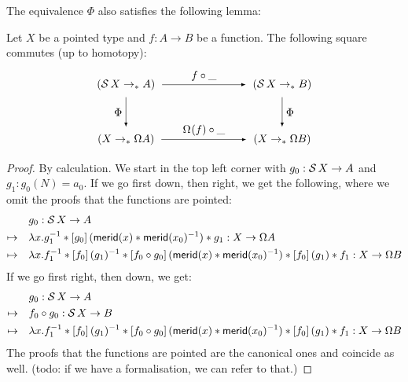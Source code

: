 \documentclass[english,a4]{article}
\renewcommand{\ap}[1]{\left[{#1}\right]}
\begin{document}
The equivalence $\Phi$ also satisfies the following lemma:

\begin{lemma} \label{lem:ap-Sigma}
    Let $X$ be a pointed type and $f : A \to B$ be a function.
    The following square commutes (up to homotopy):
    \begin{equation}
    \begin{tikzpicture}[x=5cm,y=-1.75cm,baseline=(current bounding box.center)]
    \tikzset{arrow/.style={shorten >=0.1cm,shorten <=.1cm,-latex}}
    \node (A) at (0,0) {$(\susp X \to_* A)$}; 
    \node (D) at (1,0) {$(\susp X \to_* B)$}; 
    \node (B) at (0,1) {$(X \to_* \Omega A)$}; 
    \node (C) at (1,1) {$(X \to_* \Omega B)$}; 
    
    \draw[arrow] (A) to node [above] {$f \circ \_$} (D);
    \draw[arrow] (A) to node [left] {$\Phi$} (B);
    \draw[arrow] (B) to node [above] {$\loopspace\null (f) \circ \_$} (C);
    \draw[arrow] (D) to node [right] {$\Phi$} (C);
    \end{tikzpicture}
    \end{equation}
\end{lemma}
\begin{proof}
    By calculation.
    We start in the top left corner with $g_0 : \operatorname{\mathcal S} X \to A$ and $g_1 : g_0(N) = a_0$. If we go first down, then right, we get the following, where we omit the proofs that the functions are pointed:
    \begin{equation}
    \begin{alignedat}{5}
    &\quad && g_0 : \susp X \to A & \\
    \mapsto &&& \lambda x. g_1^{-1} \ct \ap {g_0}(\mathsf{merid}(x) \ct \mathsf{merid}(x_0)^{-1}) \ct g_1 : X \to \Omega A \\
    \mapsto &&& \lambda x. f_1^{-1} \ct \ap {f_0}(g_1)^{-1} \ct  \ap {f_0 \circ g_0}(\mathsf{merid}(x) \ct \mathsf{merid}(x_0)^{-1}) \ct \ap {f_0}(g_1) \ct f_1 : X \to \Omega B
    \end{alignedat}
    \end{equation}
    If we go first right, then down, we get:
    \begin{equation}
    \begin{alignedat}{5}
    &\quad && g_0 : \susp X \to A & \\
    \mapsto &&&  f_0 \circ g_0 : \susp X \to B \\
    \mapsto &&& \lambda x. f_1^{-1} \ct \ap {f_0}(g_1)^{-1} \ct  \ap {f_0 \circ g_0}(\mathsf{merid}(x) \ct \mathsf{merid}(x_0)^{-1}) \ct \ap {f_0}(g_1) \ct f_1 : X \to \Omega B
    \end{alignedat}
    \end{equation}
    The proofs that the functions are pointed are the canonical ones and coincide as well. (todo: if we have a formalisation, we can refer to that.) 
\end{proof}
\end{document}
